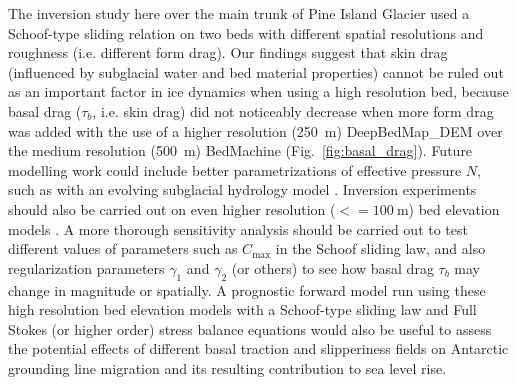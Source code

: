 The inversion study here over the main trunk of Pine Island Glacier used a Schoof-type sliding relation on two beds with different spatial resolutions and roughness (i.e. different form drag).
Our findings suggest that skin drag (influenced by subglacial water and bed material properties) cannot be ruled out as an important factor in ice dynamics when using a high resolution bed, because basal drag ($\tau_b$, i.e. skin drag) did not noticeably decrease when more form drag was added with the use of a higher resolution (\SI{250}{\metre}) DeepBedMap\_DEM over the medium resolution (\SI{500}{\metre}) BedMachine (Fig.~\ref{fig:basal_drag}).
Future modelling work could include better parametrizations of effective pressure $N$, such as with an evolving subglacial hydrology model \citep[e.g.][]{SommersSHAKTISubglacialHydrology2018}.
Inversion experiments should also be carried out on even higher resolution ($<=\SI{100}{\metre}$) bed elevation models \citep[e.g.][]{Grahamhighresolutionsyntheticbed2017}.
A more thorough sensitivity analysis should be carried out to test different values of parameters such as $C_{\text{max}}$ in the Schoof sliding law, and also regularization parameters $\gamma_1$ and $\gamma_2$ (or others) to see how basal drag $\tau_b$ may change in magnitude or spatially.
A prognostic forward model run using these high resolution bed elevation models with a Schoof-type sliding law and Full Stokes (or higher order) stress balance equations would also be useful to assess the potential effects of different basal traction and slipperiness fields on Antarctic grounding line migration and its resulting contribution to sea level rise.
